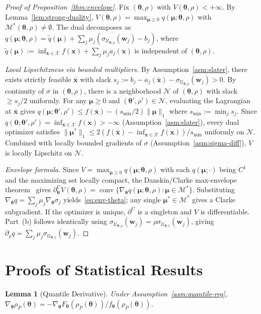 \documentclass[11pt]{article}
\newcommand{\cU}{\mathcal{U}}
\newcommand{\cX}{\mathcal{X}}
\newcommand{\cM}{\mathcal{M}}
\newcommand{\btheta}{\bm{\theta}}
\newcommand{\bmu}{\bm{\mu}}
\newcommand{\bw}{\bm{w}}
\newcommand{\bx}{\bm{x}}
\DeclareMathOperator{\conv}{conv}
\newcommand{\clsubd}{\partial^{\mathrm{C}}}
\newtheorem{lemma}[theorem]{Lemma}
\theoremstyle{definition}
\begin{document}
\begin{proof}[Proof of Proposition~\ref{thm:envelope}]
Fix $(\btheta,\rho)$ with $V(\btheta,\rho)<+\infty$. By Lemma~\ref{lem:strong-duality}, $V(\btheta,\rho)=\max_{\bmu\ge 0}q(\bmu;\btheta,\rho)$ with $\cM^*(\btheta,\rho)\neq\emptyset$. The dual decomposes as $q(\bmu;\btheta,\rho)=\tilde q(\bmu)+\sum_j\mu_j(\sigma_{\cU_{\btheta,\rho}}(\bw_j)-b_j)$, where $\tilde q(\bmu):=\inf_{\bx\in\cX}f(\bx)+\sum_j\mu_ja_j(\bx)$ is independent of $(\btheta,\rho)$.

\emph{Local Lipschitzness via bounded multipliers.}
By Assumption~\ref{asm:slater}, there exists strictly feasible $\bar{\bx}$ with slack $s_j:=b_j-a_j(\bar{\bx})-\sigma_{\cU_{\btheta,\rho}}(\bw_j)>0$. By continuity of $\sigma$ in $(\btheta,\rho)$, there is a neighborhood $\mathcal{N}$ of $(\btheta,\rho)$ with slack $\ge s_j/2$ uniformly. For any $\bmu\ge 0$ and $(\btheta',\rho')\in\mathcal{N}$, evaluating the Lagrangian at $\bar{\bx}$ gives $q(\bmu;\btheta',\rho')\le f(\bar{\bx})-(s_{\min}/2)\|\bmu\|_1$ where $s_{\min}:=\min_j s_j$. Since $q(\bm{0};\btheta',\rho')=\inf_{\bx\in\cX}f(\bx)>-\infty$ (Assumption~\ref{asm:slater}), every dual optimizer satisfies $\|\bmu^*\|_1\le 2(f(\bar{\bx})-\inf_{\bx\in\cX}f(\bx))/s_{\min}$ uniformly on $\mathcal{N}$. Combined with locally bounded gradients of $\sigma$ (Assumption~\ref{asm:sigma-diff}), $V$ is locally Lipschitz on $\mathcal{N}$.

\emph{Envelope formula.}
Since $V=\max_{\bmu\ge 0}q(\bmu;\btheta,\rho)$ with each $q(\bmu;\cdot)$ being $C^1$ and the maximizing set locally compact, the Danskin/Clarke max-envelope theorem~\citep{bonnans2000perturbation,clarke1990optimization} gives $\clsubd_{\btheta}V(\btheta,\rho)=\conv\{\nabla_{\btheta}q(\bmu;\btheta,\rho):\bmu\in\cM^*\}$. Substituting $\nabla_{\btheta}q=\sum_j\mu_j\nabla_{\btheta}\sigma_j$ yields~\eqref{eq:env-theta}; any single $\bmu^*\in\cM^*$ gives a Clarke subgradient. If the optimizer is unique, $\clsubd$ is a singleton and $V$ is differentiable. Part~(b) follows identically using $\sigma_{\cU_{\btheta,\rho}}(\bw_j)=\rho\sigma_{\cU_{\btheta,1}}(\bw_j)$, giving $\partial_\rho q=\sum_j\mu_j\sigma_{\cU_{\btheta,1}}(\bw_j)$.
\end{proof}

\section{Proofs of Statistical Results}
\label{app:statistical-proofs}

\begin{lemma}[Quantile Derivative]\label{lem:quantile-deriv}
Under Assumption~\ref{asm:quantile-reg}, $\nabla_{\btheta} \rho_P(\btheta) = -\nabla_{\btheta} F_{\btheta}(\rho_P(\btheta))/f_{\btheta}(\rho_P(\btheta))$.
\end{lemma}
\end{document}

